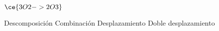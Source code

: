 $\ce{3O2 -> 2O3}$

\begin{choices}
    \choice Descomposición
    \CorrectChoice Combinación
    \choice Desplazamiento
    \choice Doble desplazamiento
\end{choices}